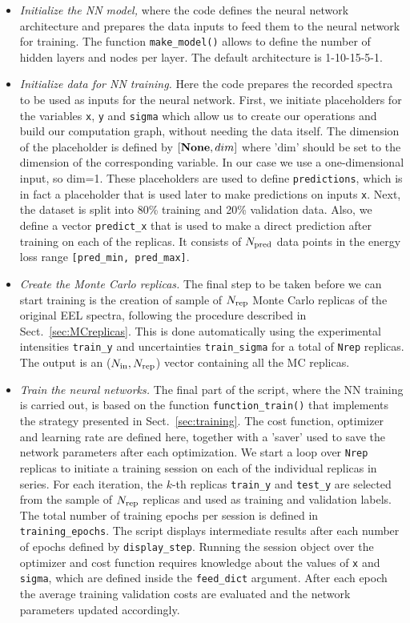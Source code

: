 \begin{itemize}
\item {\it Initialize the NN model,} where the code
  defines the neural network architecture and prepares the
data inputs to feed them to the neural network for training. 
%
The function {\tt make\_model()} allows to define the number of hidden layers and 
nodes per layer. The default  architecture is 1-10-15-5-1.

\item {\it Initialize data for NN training.}
  Here the code prepares the recorded spectra to be used
as inputs for the neural network. 
%
First, we initiate placeholders for the variables
{\tt x}, {\tt y} and {\tt sigma} which
allow us to create our operations and 
build our computation graph, without needing the data itself. 
%
The dimension of the placeholder is defined by {\tt $[{\bf None}, dim]$} where 'dim'
should be set to the dimension of the corresponding variable. In our case we use a 
one-dimensional input, so dim=1. 
%
These placeholders are used to define {\tt predictions}, which is in fact a placeholder that is used 
later to make predictions on inputs {\tt x}. 
%
Next, the dataset is split into 80\% training and
20\% validation data.
%
Also, we define a vector {\tt predict\_x} that is used to make a direct prediction after training
on each of the replicas. It consists of $N_{\rm pred}$ data points in the energy loss range
{\tt [pred\_min, pred\_max]}. 

\item {\it Create the Monte Carlo replicas.}
  The final step to be taken before we can start training is the creation of
  sample of $N_{\rm rep}$ Monte Carlo replicas of the original EEL spectra,
  following the procedure described in Sect.~\ref{sec:MCreplicas}.
%
This is done automatically using the experimental intensities {\tt train\_y} and uncertainties
{\tt train\_sigma} for a total of {\tt Nrep} replicas. The output is an ($N_{\rm in}, N_{\rm rep}$) 
vector containing all the MC replicas. 

\item {\it Train the neural networks.}
  The final part of the script, where the NN training is  carried out,
  is based on the function {\tt function\_train()} that
  implements the strategy presented in Sect.~\ref{sec:training}.
%
The cost function, optimizer and learning rate are defined here, together with a 'saver' used to 
save the network parameters after each optimization. 
%
We start a loop over {\tt Nrep} replicas to initiate a training session on each of the individual replicas
in series. 
%
For each iteration, the $k$-th replicas {\tt train\_y} and {\tt test\_y} are
selected from the sample of $N_{\rm rep}$ replicas
and used as training and validation labels. 
%
The total number of training epochs per session is defined in {\tt training\_epochs}.
%
The script displays intermediate 
results after each number of epochs defined by {\tt display\_step}. 
%
Running the session object over the optimizer and cost function requires knowledge about the values of {\tt x} and {\tt sigma}, which 
are defined inside the {\tt feed\_dict} argument. 
%
After each epoch the average training  validation costs are evaluated
and the network parameters  updated accordingly.


\end{itemize}
